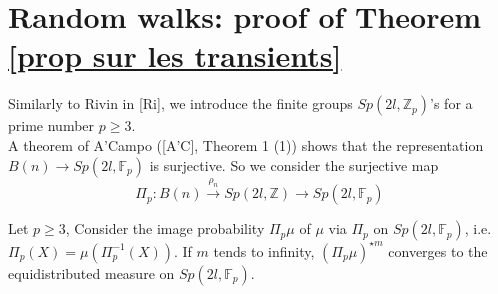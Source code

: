 \documentclass[12pt]{article}
\begin{document}
\section{Random walks: proof of Theorem \ref{prop sur les transients}}
Similarly to Rivin in [Ri], we introduce the finite groups $Sp(2l,\mathbb{Z}_p)$'s for a prime number $p\geq 3$.\\
A theorem of A'Campo  ([A'C], Theorem 1 (1)) shows that the representation $B(n)\longrightarrow Sp(2l,\mathbb{F}_p)$  is surjective. So we consider the surjective map
\begin{equation}\label{representation symplectique}
\Pi_p:B(n)\overset{\rho_n}{\longrightarrow} Sp(2l,\mathbb{Z})
\longrightarrow Sp(2l,\mathbb{F}_p)
\end{equation}   
\begin{lem}\label{uniforme sur Psp} 
	Let $p\geq 3$, Consider the image probability $\Pi_p\mu$ of $\mu$ via $\Pi_p$ on $Sp(2l,\mathbb{F}_p)$, i.e. $\Pi_p(X)=\mu(\Pi_p^{-1}(X))$.  If $m$ tends to infinity, $(\Pi_p\mu)^{\star m}$ converges to the equidistributed measure on $Sp(2l,{\mathbb{F}_p})$. 
\end{lem}
\end{document}
